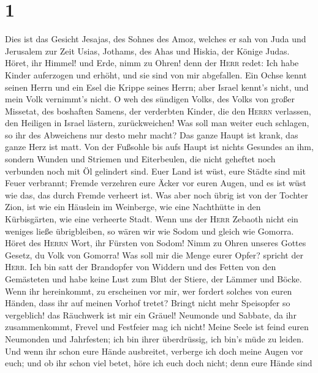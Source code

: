 \hypertarget{section}{%
\section{1}\label{section}}

 Dies ist das Gesicht Jesajas, des Sohnes des Amoz,
welches er sah von Juda und Jerusalem zur Zeit Usias, Jothams, des Ahas
und Hiskia, der Könige Judas.  Höret, ihr Himmel! und
Erde, nimm zu Ohren! denn der \textsc{Herr} redet: Ich habe Kinder
auferzogen und erhöht, und sie sind von mir abgefallen. 
Ein Ochse kennt seinen Herrn und ein Esel die Krippe seines Herrn; aber
Israel kennt's nicht, und mein Volk vernimmt's nicht.  O
weh des sündigen Volks, des Volks von großer Missetat, des boshaften
Samens, der verderbten Kinder, die den \textsc{Herrn} verlassen, den
Heiligen in Israel lästern, zurückweichen!  Was soll man
weiter euch schlagen, so ihr des Abweichens nur desto mehr macht? Das
ganze Haupt ist krank, das ganze Herz ist matt.  Von der
Fußsohle bis aufs Haupt ist nichts Gesundes an ihm, sondern Wunden und
Striemen und Eiterbeulen, die nicht geheftet noch verbunden noch mit Öl
gelindert sind.  Euer Land ist wüst, eure Städte sind mit
Feuer verbrannt; Fremde verzehren eure Äcker vor euren Augen, und es ist
wüst wie das, das durch Fremde verheert ist.  Was aber
noch übrig ist von der Tochter Zion, ist wie ein Häuslein im Weinberge,
wie eine Nachthütte in den Kürbisgärten, wie eine verheerte Stadt.
 Wenn uns der \textsc{Herr} Zebaoth nicht ein weniges
ließe übrigbleiben, so wären wir wie Sodom und gleich wie Gomorra.
 Höret des \textsc{Herrn} Wort, ihr Fürsten von Sodom!
Nimm zu Ohren unseres Gottes Gesetz, du Volk von Gomorra!
 Was soll mir die Menge eurer Opfer? spricht der
\textsc{Herr}. Ich bin satt der Brandopfer von Widdern und des Fetten
von den Gemästeten und habe keine Lust zum Blut der Stiere, der Lämmer
und Böcke.  Wenn ihr hereinkommt, zu erscheinen vor mir,
wer fordert solches von euren Händen, dass ihr auf meinen Vorhof tretet?
 Bringt nicht mehr Speisopfer so vergeblich! das
Räuchwerk ist mir ein Gräuel! Neumonde und Sabbate, da ihr
zusammenkommt, Frevel und Festfeier mag ich nicht!  Meine
Seele ist feind euren Neumonden und Jahrfesten; ich bin ihrer
überdrüssig, ich bin's müde zu leiden.  Und wenn ihr
schon eure Hände ausbreitet, verberge ich doch meine Augen vor euch; und
ob ihr schon viel betet, höre ich euch doch nicht; denn eure Hände sind
